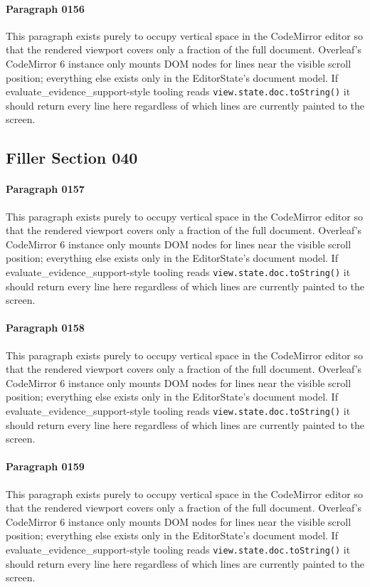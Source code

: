 \documentclass{article}
\begin{document}
\paragraph{Paragraph 0156}
This paragraph exists purely to occupy vertical space in the CodeMirror editor so that the rendered viewport covers only a fraction of the full document. Overleaf's CodeMirror 6 instance only mounts DOM nodes for lines near the visible scroll position; everything else exists only in the EditorState's document model. If evaluate\_evidence\_support-style tooling reads \texttt{view.state.doc.toString()} it should return every line here regardless of which lines are currently painted to the screen.

\subsection{Filler Section 040}
\paragraph{Paragraph 0157}
This paragraph exists purely to occupy vertical space in the CodeMirror editor so that the rendered viewport covers only a fraction of the full document. Overleaf's CodeMirror 6 instance only mounts DOM nodes for lines near the visible scroll position; everything else exists only in the EditorState's document model. If evaluate\_evidence\_support-style tooling reads \texttt{view.state.doc.toString()} it should return every line here regardless of which lines are currently painted to the screen.

\paragraph{Paragraph 0158}
This paragraph exists purely to occupy vertical space in the CodeMirror editor so that the rendered viewport covers only a fraction of the full document. Overleaf's CodeMirror 6 instance only mounts DOM nodes for lines near the visible scroll position; everything else exists only in the EditorState's document model. If evaluate\_evidence\_support-style tooling reads \texttt{view.state.doc.toString()} it should return every line here regardless of which lines are currently painted to the screen.

\paragraph{Paragraph 0159}
This paragraph exists purely to occupy vertical space in the CodeMirror editor so that the rendered viewport covers only a fraction of the full document. Overleaf's CodeMirror 6 instance only mounts DOM nodes for lines near the visible scroll position; everything else exists only in the EditorState's document model. If evaluate\_evidence\_support-style tooling reads \texttt{view.state.doc.toString()} it should return every line here regardless of which lines are currently painted to the screen.
\end{document}
